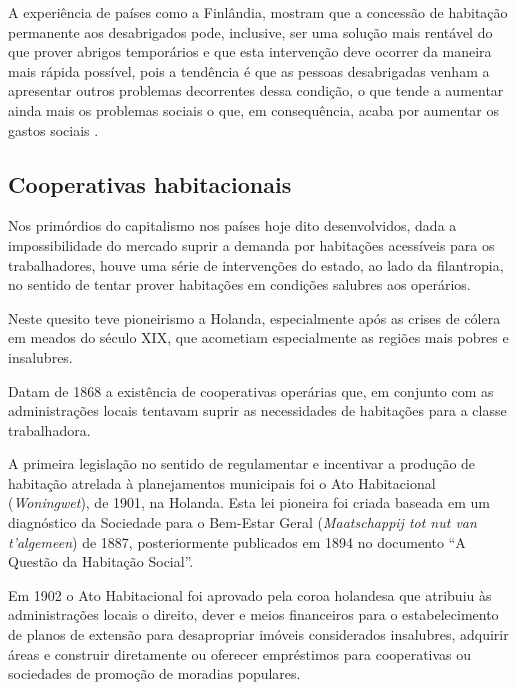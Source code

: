 \documentclass[
	12pt,				%
	oneside,			%
	a4paper,			%
	chapter=TITLE,		%
	section=TITLE,		%
	english,			%
	brazil				%
	]{abntex2}
\begin{document}
\begin{refsection}
A experiência de países como a Finlândia, mostram que a concessão
de habitação permanente aos desabrigados pode, inclusive, ser uma solução mais
rentável do que prover abrigos temporários e que esta intervenção deve ocorrer
da maneira mais rápida possível, pois a tendência é que as pessoas desabrigadas
venham a apresentar outros problemas decorrentes dessa condição, o que tende
a aumentar ainda mais os problemas sociais o que, em consequência, acaba por
aumentar os gastos sociais \autocite{finlandia}.

\hypertarget{cooperativas-habitacionais}{%
\subsection{Cooperativas habitacionais}\label{cooperativas-habitacionais}}

Nos primórdios do capitalismo nos países hoje dito desenvolvidos, dada a
impossibilidade do mercado suprir a demanda por habitações acessíveis para os
trabalhadores, houve uma série de intervenções do estado, ao lado da filantropia,
no sentido de tentar prover habitações em condições salubres aos operários.

Neste quesito teve pioneirismo a Holanda, especialmente após as crises de cólera
em meados do século XIX, que acometiam especialmente as regiões mais pobres e
insalubres.

Datam de 1868 a existência de cooperativas operárias que, em conjunto com as
administrações locais tentavam suprir as necessidades de habitações para a
classe trabalhadora.

A primeira legislação no sentido de regulamentar e incentivar a produção de
habitação atrelada à planejamentos municipais foi o Ato Habitacional
(\emph{Woningwet}), de 1901, na Holanda. Esta lei pioneira foi criada baseada em um
diagnóstico da Sociedade para o Bem-Estar Geral
(\emph{Maatschappij tot nut van t'algemeen}) de 1887, posteriormente publicados em
1894 no documento ``A Questão da Habitação Social''.

Em 1902 o Ato Habitacional foi aprovado pela coroa holandesa que atribuiu às
administrações locais o direito, dever e meios financeiros para o
estabelecimento de planos de extensão para desapropriar imóveis considerados
insalubres, adquirir áreas e construir diretamente ou oferecer empréstimos para
cooperativas ou sociedades de promoção de moradias populares.


\end{refsection}
\end{document}
